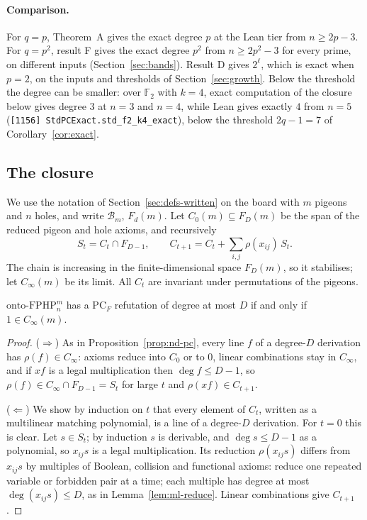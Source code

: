 \paragraph{Comparison.}  For $q=p$, Theorem~A gives the exact degree $p$ at the Lean tier
from $n\ge2p-3$.  For $q=p^2$, result F gives the exact degree $p^2$ from $n\ge2p^2-3$ for
every prime, on different inputs (Section~\ref{sec:bands}).  Result D gives $2^\ell$, which is
exact when $p=2$, on the inputs and thresholds of Section~\ref{sec:growth}.
Below the threshold the degree can be smaller: over $\mathbb F_2$ with $k=4$, exact
computation of the closure below gives degree $3$ at $n=3$ and $n=4$, while Lean gives
exactly $4$ from $n=5$ (\texttt{[1156] StdPCExact.std\_f2\_k4\_exact}), below the threshold
$2q-1=7$ of Corollary~\ref{cor:exact}.

\subsection{The closure}\label{sec:periodicity-closure}

We use the notation of Section~\ref{sec:defs-written} on the board with $m$ pigeons and $n$
holes, and write $\mathcal B_m$, $F_d(m)$.  Let $C_0(m)\subseteq F_D(m)$ be the span of the
reduced pigeon and hole axioms, and recursively
\[
  S_t=C_t\cap F_{D-1},\qquad
  C_{t+1}=C_t+\sum_{i,j}\rho(x_{ij})\,S_t .
\]
The chain is increasing in the finite-dimensional space $F_D(m)$, so it stabilises; let
$C_\infty(m)$ be its limit.  All $C_t$ are invariant under permutations of the pigeons.

\begin{lemma}\label{lem:closure}
$\mathrm{onto\text{-}FPHP}^m_n$ has a $\mathrm{PC}_F$ refutation of degree at most $D$ if and
only if $1\in C_\infty(m)$.
\end{lemma}

\begin{proof}
($\Rightarrow$) As in Proposition~\ref{prop:nd-pc}, every line $f$ of a degree-$D$
derivation has $\rho(f)\in C_\infty$: axioms reduce into $C_0$ or to $0$, linear combinations
stay in $C_\infty$, and if $xf$ is a legal multiplication then $\deg f\le D-1$, so
$\rho(f)\in C_\infty\cap F_{D-1}=S_t$ for large $t$ and $\rho(xf)\in C_{t+1}$.

($\Leftarrow$) We show by induction on $t$ that every element of $C_t$, written as a
multilinear matching polynomial, is a line of a degree-$D$ derivation.  For $t=0$ this is
clear.  Let $s\in S_t$; by induction $s$ is derivable, and $\deg s\le D-1$ as a polynomial,
so $x_{ij}s$ is a legal multiplication.  Its reduction $\rho(x_{ij}s)$ differs from
$x_{ij}s$ by multiples of Boolean, collision and functional axioms: reduce one repeated
variable or forbidden pair at a time; each multiple has degree at most $\deg(x_{ij}s)\le D$,
as in Lemma~\ref{lem:ml-reduce}.  Linear combinations give $C_{t+1}$.
\end{proof}

